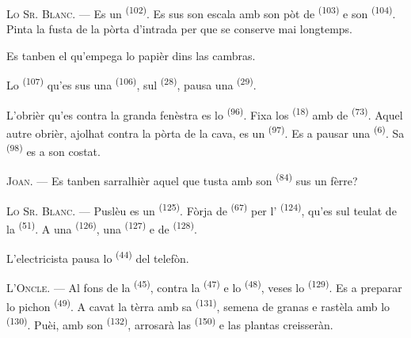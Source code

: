 \textsc{Lo Sr. Blanc}. --- Es un  \textsuperscript{(102)}. Es sus
son escala amb son pòt de  \textsuperscript{(103)} e son
 \textsuperscript{(104)}. Pinta la fusta de la pòrta d'intrada per
que se conserve mai longtemps.

Es tanben el qu'empega lo papièr dins las cambras.

Lo  \textsuperscript{(107)} qu'es sus una 
\textsuperscript{(106)}, sul  \textsuperscript{(28)}, pausa una
 \textsuperscript{(29)}.

L'obrièr qu'es contra la granda fenèstra es lo 
\textsuperscript{(96)}. Fixa los  \textsuperscript{(18)} amb de
 \textsuperscript{(73)}. Aquel autre obrièr, ajolhat contra la
pòrta de la cava, es un  \textsuperscript{(97)}. Es a pausar
una  \textsuperscript{(6)}. Sa 
\textsuperscript{(98)} es a son costat.

\textsc{Joan}. --- Es tanben sarralhièr aquel que tusta amb son 
\textsuperscript{(84)} sus un fèrre?

\textsc{Lo Sr. Blanc}. --- Puslèu es un  \textsuperscript{(125)}.
Fòrja de  \textsuperscript{(67)} per l'
\textsuperscript{(124)}, qu'es sul teulat de la 
\textsuperscript{(51)}. A una  \textsuperscript{(126)}, una
 \textsuperscript{(127)} e de 
\textsuperscript{(128)}.

L'electricista pausa lo  \textsuperscript{(44)} del telefòn.

\VUsaut{3.0mm}

\textsc{L'Oncle}. --- Al fons de la  \textsuperscript{(45)}, contra
la  \textsuperscript{(47)} e lo 
\textsuperscript{(48)}, veses lo  \textsuperscript{(129)}. Es a
preparar lo pichon  \textsuperscript{(49)}. A cavat la tèrra amb sa
 \textsuperscript{(131)}, semena de granas e rastèla amb lo
 \textsuperscript{(130)}. Puèi, amb son 
\textsuperscript{(132)}, arrosarà las 
\textsuperscript{(150)} e las plantas creisseràn.

